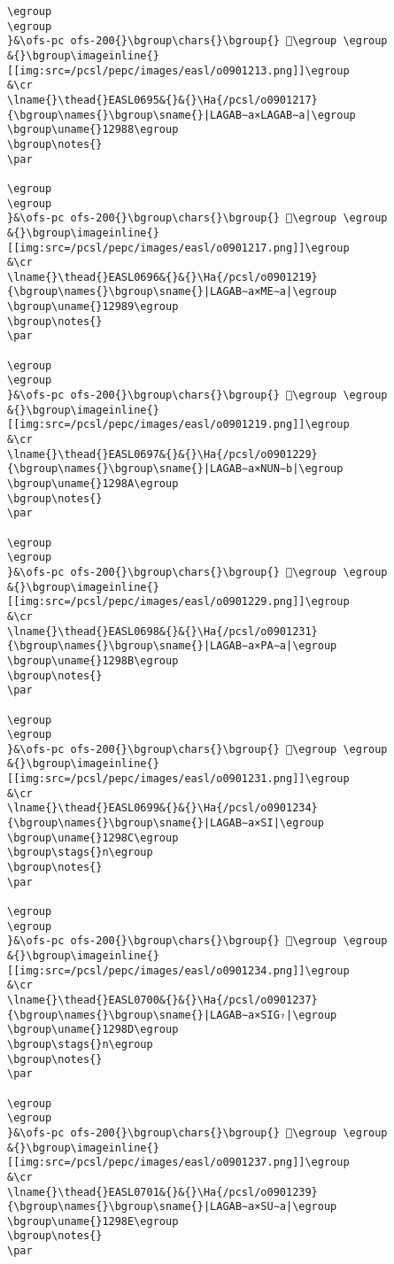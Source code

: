 \begin{verbatim}
\egroup
\egroup
}&\ofs-pc ofs-200{}\bgroup\chars{}\bgroup{} 𒦇\egroup \egroup
&{}\bgroup\imageinline{}[[img:src=/pcsl/pepc/images/easl/o0901213.png]]\egroup
&\cr
\lname{}\thead{}EASL0695&{}&{}\Ha{/pcsl/o0901217}{\bgroup\names{}\bgroup\sname{}|LAGAB∼a×LAGAB∼a|\egroup
\bgroup\uname{}12988\egroup
\bgroup\notes{}
\par 

\egroup
\egroup
}&\ofs-pc ofs-200{}\bgroup\chars{}\bgroup{} 𒦈\egroup \egroup
&{}\bgroup\imageinline{}[[img:src=/pcsl/pepc/images/easl/o0901217.png]]\egroup
&\cr
\lname{}\thead{}EASL0696&{}&{}\Ha{/pcsl/o0901219}{\bgroup\names{}\bgroup\sname{}|LAGAB∼a×ME∼a|\egroup
\bgroup\uname{}12989\egroup
\bgroup\notes{}
\par 

\egroup
\egroup
}&\ofs-pc ofs-200{}\bgroup\chars{}\bgroup{} 𒦉\egroup \egroup
&{}\bgroup\imageinline{}[[img:src=/pcsl/pepc/images/easl/o0901219.png]]\egroup
&\cr
\lname{}\thead{}EASL0697&{}&{}\Ha{/pcsl/o0901229}{\bgroup\names{}\bgroup\sname{}|LAGAB∼a×NUN∼b|\egroup
\bgroup\uname{}1298A\egroup
\bgroup\notes{}
\par 

\egroup
\egroup
}&\ofs-pc ofs-200{}\bgroup\chars{}\bgroup{} 𒦊\egroup \egroup
&{}\bgroup\imageinline{}[[img:src=/pcsl/pepc/images/easl/o0901229.png]]\egroup
&\cr
\lname{}\thead{}EASL0698&{}&{}\Ha{/pcsl/o0901231}{\bgroup\names{}\bgroup\sname{}|LAGAB∼a×PA∼a|\egroup
\bgroup\uname{}1298B\egroup
\bgroup\notes{}
\par 

\egroup
\egroup
}&\ofs-pc ofs-200{}\bgroup\chars{}\bgroup{} 𒦋\egroup \egroup
&{}\bgroup\imageinline{}[[img:src=/pcsl/pepc/images/easl/o0901231.png]]\egroup
&\cr
\lname{}\thead{}EASL0699&{}&{}\Ha{/pcsl/o0901234}{\bgroup\names{}\bgroup\sname{}|LAGAB∼a×SI|\egroup
\bgroup\uname{}1298C\egroup
\bgroup\stags{}n\egroup
\bgroup\notes{}
\par 

\egroup
\egroup
}&\ofs-pc ofs-200{}\bgroup\chars{}\bgroup{} 𒦌\egroup \egroup
&{}\bgroup\imageinline{}[[img:src=/pcsl/pepc/images/easl/o0901234.png]]\egroup
&\cr
\lname{}\thead{}EASL0700&{}&{}\Ha{/pcsl/o0901237}{\bgroup\names{}\bgroup\sname{}|LAGAB∼a×SIG₇|\egroup
\bgroup\uname{}1298D\egroup
\bgroup\stags{}n\egroup
\bgroup\notes{}
\par 

\egroup
\egroup
}&\ofs-pc ofs-200{}\bgroup\chars{}\bgroup{} 𒦍\egroup \egroup
&{}\bgroup\imageinline{}[[img:src=/pcsl/pepc/images/easl/o0901237.png]]\egroup
&\cr
\lname{}\thead{}EASL0701&{}&{}\Ha{/pcsl/o0901239}{\bgroup\names{}\bgroup\sname{}|LAGAB∼a×SU∼a|\egroup
\bgroup\uname{}1298E\egroup
\bgroup\notes{}
\par 


\end{verbatim}
